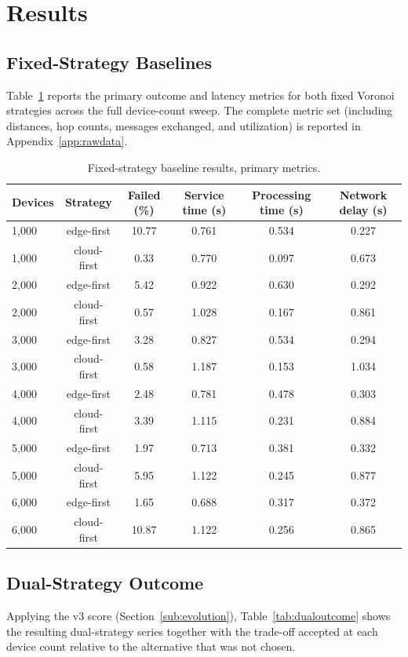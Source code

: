 \documentclass[10pt,conference]{IEEEtran}
\begin{document}
\section{Results}\label{sec:results}
\subsection{Fixed-Strategy Baselines}\label{sub:baselines}
Table~\ref{tab:baseline} reports the primary outcome and latency metrics for both fixed Voronoi strategies across the full device-count sweep. The complete metric set (including distances, hop counts, messages exchanged, and utilization) is reported in Appendix~\ref{app:rawdata}.

\begin{table}[!t]
\centering
\caption{Fixed-strategy baseline results, primary metrics.}
\label{tab:baseline}
\begin{tabular}{lccccc}
\toprule
\textbf{Devices} & \textbf{Strategy} & \textbf{Failed (\%)} & \textbf{Service time (s)} & \textbf{Processing time (s)} & \textbf{Network delay (s)} \\
\midrule
1,000 & edge-first & 10.77 & 0.761 & 0.534 & 0.227 \\
1,000 & cloud-first & 0.33 & 0.770 & 0.097 & 0.673 \\
2,000 & edge-first & 5.42 & 0.922 & 0.630 & 0.292 \\
2,000 & cloud-first & 0.57 & 1.028 & 0.167 & 0.861 \\
3,000 & edge-first & 3.28 & 0.827 & 0.534 & 0.294 \\
3,000 & cloud-first & 0.58 & 1.187 & 0.153 & 1.034 \\
4,000 & edge-first & 2.48 & 0.781 & 0.478 & 0.303 \\
4,000 & cloud-first & 3.39 & 1.115 & 0.231 & 0.884 \\
5,000 & edge-first & 1.97 & 0.713 & 0.381 & 0.332 \\
5,000 & cloud-first & 5.95 & 1.122 & 0.245 & 0.877 \\
6,000 & edge-first & 1.65 & 0.688 & 0.317 & 0.372 \\
6,000 & cloud-first & 10.87 & 1.122 & 0.256 & 0.865 \\
\bottomrule
\end{tabular}
\end{table}

\subsection{Dual-Strategy Outcome}\label{sub:dualoutcome}
Applying the v3 score (Section~\ref{sub:evolution}), Table~\ref{tab:dualoutcome} shows the resulting dual-strategy series together with the trade-off accepted at each device count relative to the alternative that was not chosen.
\end{document}
